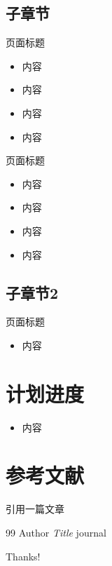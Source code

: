 \documentclass{beamer}
\begin{document}
\subsection{子章节}

\begin{frame}{页面标题}
    \begin{itemize}
        \item 内容
        \item 内容
        \item 内容
        \item 内容
    \end{itemize}
\end{frame}

\begin{frame}{页面标题}
    \begin{itemize}
        \item 内容
        \item 内容
        \item 内容
        \item 内容
    \end{itemize}
\end{frame}
\subsection{子章节2}

\begin{frame}{页面标题}
    \begin{itemize}
        \item 内容
    \end{itemize}
\end{frame}

\section{计划进度}
\begin{frame}
    \begin{itemize}
        \item 内容
    \end{itemize}
\end{frame}


\section{参考文献}

\begin{frame}
引用一篇文章 \cite{article1} 
     \begin{thebibliography}{99}
        Author
        \emph{Title}
        journal
    \end{thebibliography}
\end{frame}

\begin{frame}
    \begin{center}
        {\Huge\calligra Thanks!}
    \end{center}
\end{frame}
\end{document}

